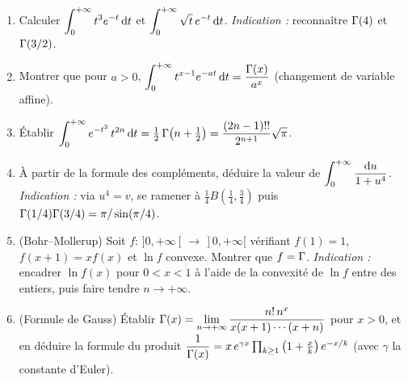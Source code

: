 \begin{mdframed}[style=exobar]
  \begin{enumerate}
    \item Calculer $\displaystyle\int_0^{+\infty} t^{3}e^{-t}\,\mathrm{d}t$ et
          $\displaystyle\int_0^{+\infty} \sqrt{t}\,e^{-t}\,\mathrm{d}t$.
          \textit{Indication :} reconnaître $\Gamma(4)$ et $\Gamma(3/2)$.

    \item Montrer que pour $a>0$,
          $\displaystyle\int_0^{+\infty} t^{x-1}e^{-at}\,\mathrm{d}t
          =\dfrac{\Gamma(x)}{a^{x}}$ (changement de variable affine).

    \item Établir $\displaystyle\int_0^{+\infty} e^{-t^2}\,t^{2n}\,\mathrm{d}t
          =\tfrac12\,\Gamma\!\left(n+\tfrac12\right)
          =\dfrac{(2n-1)!!}{2^{n+1}}\sqrt{\pi}$.

    \item À partir de la formule des compléments, déduire la valeur de
          $\displaystyle\int_0^{+\infty}\frac{\mathrm{d}u}{1+u^4}$.
          \textit{Indication :} via $u^4=v$, se ramener à
          $\tfrac14 B\!\left(\tfrac14,\tfrac34\right)$ puis
          $\Gamma(1/4)\Gamma(3/4)=\pi/\sin(\pi/4)$.

    \item (Bohr--Mollerup) Soit $f:\,]0,+\infty[\,\to\,]0,+\infty[$ vérifiant
          $f(1)=1$, $f(x+1)=x f(x)$ et $\ln f$ convexe. Montrer que
          $f=\Gamma$. \textit{Indication :} encadrer $\ln f(x)$ pour
          $0<x<1$ à l'aide de la convexité de $\ln f$ entre des entiers, puis
          faire tendre $n\to+\infty$.

    \item (Formule de Gauss) Établir
          $\displaystyle\Gamma(x)=\lim_{n\to+\infty}
          \frac{n!\,n^{x}}{x(x+1)\cdots(x+n)}$ pour $x>0$, et en déduire la
          formule du produit
          $\dfrac{1}{\Gamma(x)}=x\,e^{\gamma x}\prod_{k\geq 1}
          \left(1+\tfrac{x}{k}\right)e^{-x/k}$
          (avec $\gamma$ la constante d'Euler).
  \end{enumerate}
\end{mdframed}

